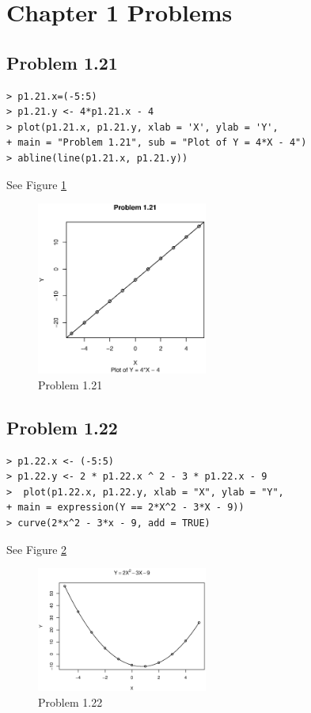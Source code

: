 \section{Chapter 1 Problems}
\graphicspath{{figures/chapter1/}}
\subsection{Problem 1.21}
\begin{lstlisting}
> p1.21.x=(-5:5)
> p1.21.y <- 4*p1.21.x - 4
> plot(p1.21.x, p1.21.y, xlab = 'X', ylab = 'Y', 
+ main = "Problem 1.21", sub = "Plot of Y = 4*X - 4")
> abline(line(p1.21.x, p1.21.y))
\end{lstlisting}
	See Figure \ref{p1.21}
	\begin{figure}[!htb]
	  \centering
	  \includegraphics[width=0.5\textwidth]{p1.21.eps}
	  \caption{Problem 1.21 \label{p1.21}}
	\end{figure}

\subsection{Problem 1.22}
\begin{lstlisting}
> p1.22.x <- (-5:5)
> p1.22.y <- 2 * p1.22.x ^ 2 - 3 * p1.22.x - 9
>  plot(p1.22.x, p1.22.y, xlab = "X", ylab = "Y",
+ main = expression(Y == 2*X^2 - 3*X - 9))
> curve(2*x^2 - 3*x - 9, add = TRUE)
\end{lstlisting}
	See Figure \ref{p1.22}
	\begin{figure}[!htb]
	  \centering
	  \includegraphics[width=0.5\textwidth]{p1.22.eps}
	  \caption{Problem 1.22 \label{p1.22}}
	\end{figure}

